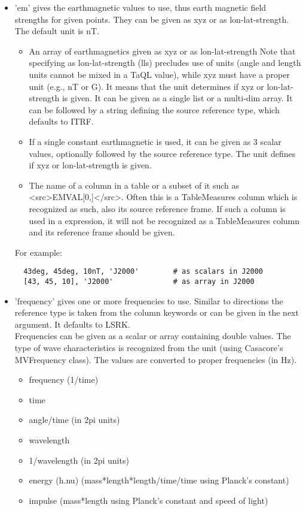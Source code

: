 \begin{itemize}
\item 'em' gives the earthmagnetic values to use, thus earth
  magnetic field strengths for given points. They can be given
  as xyz or as lon-lat-strength. The default unit is nT.
  \begin{itemize}
  \item An array of earthmagnetics given as xyz or as lon-lat-strength
    Note that specifying as lon-lat-strength (lls) precludes use of units
    (angle and length units cannot be mixed in a TaQL value),
    while xyz must have a proper unit (e.g., nT or G). It means that the
    unit determines if xyz or lon-lat-strength is given.
    It can be given as a single list or a multi-dim array.
    It can be followed by a string defining the source
    reference type, which defaults to ITRF.
  \item If a single constant earthmagnetic is used, it can be given as
    3 scalar values, optionally followed by the source
    reference type. The unit defines if xyz or lon-lat-strength is
    given.
  \item The name of a column in a table or a subset of it such as
    <src>EMVAL[0,]</src>. Often this is a TableMeasures column
    which is recognized as such, also its source reference frame.
    If such a column is used in a expression, it will not be
    recognized as a TableMeasures column and its reference frame
    should be given.
  \end{itemize}

  For example:
\begin{verbatim}
  43deg, 45deg, 10nT, 'J2000'        # as scalars in J2000
  [43, 45, 10], 'J2000'              # as array in J2000
\end{verbatim}

\item 'frequency' gives one or more frequencies to use. Similar to
  directions the reference type is taken from the column keywords or
  can be given in the next argument. It defaults to LSRK.
  \\Frequencies can be given as a scalar or array containing double
  values. The type of wave characteristics is recognized from the unit
  (using Casacore's MVFrequency class). 
  The values are converted to proper frequencies (in Hz).
  \begin{itemize}
  \item frequency (1/time)
  \item time
  \item angle/time (in 2pi units)
  \item wavelength
  \item 1/wavelength (in 2pi units)
  \item energy (h.nu) (mass*length*length/time/time using Planck's constant)
  \item impulse (mass*length using Planck's constant and speed of light)
  \end{itemize}


\end{itemize}
